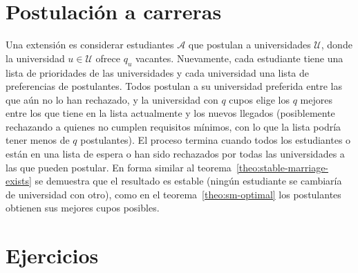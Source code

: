 \section{Postulación a carreras}
\label{sec:postulacion-carreras}

  Una extensión es considerar estudiantes \(\mathscr{A}\)
  que postulan a universidades \(\mathscr{U}\),
  donde la universidad \(u \in \mathscr{U}\) ofrece \(q_u\) vacantes.
  Nuevamente,
  cada estudiante tiene una lista de prioridades de las universidades
  y cada universidad una lista de preferencias de postulantes.
  Todos postulan a su universidad preferida
  entre las que aún no lo han rechazado,
  y la universidad con \(q\) cupos elige los \(q\) mejores
  entre los que tiene en la lista actualmente y los nuevos llegados
  (posiblemente rechazando a quienes no cumplen requisitos mínimos,
   con lo que la lista podría tener menos de \(q\) postulantes).
  El proceso termina cuando todos los estudiantes
  o están en una lista de espera
  o han sido rechazados por todas las universidades
  a las que pueden postular.
  En forma similar al teorema~\ref{theo:stable-marriage-exists}
  se demuestra que el resultado es estable
  (ningún estudiante se cambiaría de universidad con otro),
  como en el teorema~\ref{theo:sm-optimal}
  los postulantes obtienen sus mejores cupos posibles.

\section*{Ejercicios}
\label{sec:ejercicios-07-previa}

